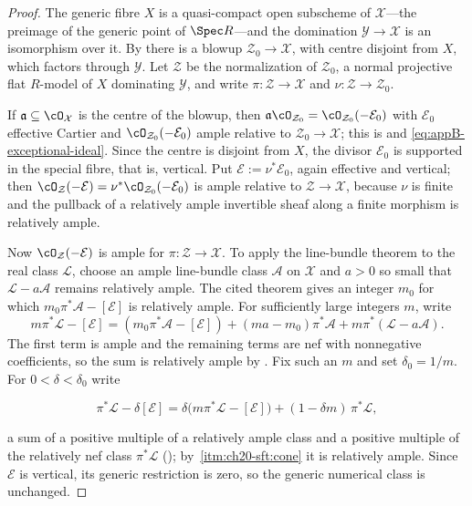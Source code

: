 \begin{proof}
The generic fibre $X$ is a quasi-compact open subscheme of
$\mathcal X$---the preimage of the generic point of $\Spec R$---and the
domination $\mathcal Y\to\mathcal X$ is an isomorphism over it.  By
 there is a blowup
$\mathcal Z_0\to\mathcal X$, with centre disjoint from $X$, which
factors through $\mathcal Y$.  Let $\mathcal Z$ be the normalization of
$\mathcal Z_0$, a normal projective flat $R$-model of $X$ dominating
$\mathcal Y$, and write $\pi:\mathcal Z\to\mathcal X$ and
$\nu:\mathcal Z\to\mathcal Z_0$.

If $\mathfrak a\subseteq\cO_{\mathcal X}$ is the centre of the blowup,
then $\mathfrak a\cO_{\mathcal Z_0}=\cO_{\mathcal Z_0}(-\mathcal E_0)$
with $\mathcal E_0$ effective Cartier and
$\cO_{\mathcal Z_0}(-\mathcal E_0)$ ample relative to
$\mathcal Z_0\to\mathcal X$; this is
 and
\eqref{eq:appB-exceptional-ideal}.  Since the centre is disjoint from
$X$, the divisor $\mathcal E_0$ is supported in the special fibre, that
is, vertical.  Put $\mathcal E:=\nu^*\mathcal E_0$, again effective and
vertical; then
$\cO_{\mathcal Z}(-\mathcal E)=\nu^*\cO_{\mathcal Z_0}(-\mathcal E_0)$ is
ample relative to $\mathcal Z\to\mathcal X$, because $\nu$ is finite and
the pullback of a relatively ample invertible sheaf along a finite morphism
is relatively ample.

Now $\cO_{\mathcal Z}(-\mathcal E)$ is ample for
$\pi:\mathcal Z\to\mathcal X$.  To apply the line-bundle theorem
\cite[4.6.13]{EGAII} to the real class $\mathcal L$, choose an ample
line-bundle class $\mathcal A$ on $\mathcal X$ and $a>0$ so small that
$\mathcal L-a\mathcal A$ remains relatively ample.  The cited theorem
gives an integer $m_0$ for which
$m_0\pi^*\mathcal A-[\mathcal E]$ is relatively ample.
For sufficiently large integers $m$, write
\[
 m\pi^*\mathcal L-[\mathcal E]
 =(m_0\pi^*\mathcal A-[\mathcal E])
   +(ma-m_0)\pi^*\mathcal A
   +m\pi^*(\mathcal L-a\mathcal A).
\]
The first term is ample and the remaining terms are nef with nonnegative
coefficients, so the sum is relatively ample by
.  Fix
such an $m$ and set $\delta_0=1/m$.  For $0<\delta<\delta_0$ write

\[
 \pi^*\mathcal L-\delta[\mathcal E]
 =\delta\bigl(m\pi^*\mathcal L-[\mathcal E]\bigr)
  +(1-\delta m)\,\pi^*\mathcal L ,
\]

a sum of a positive multiple of a relatively ample class and a positive
multiple of the relatively nef class $\pi^*\mathcal L$
(); by
\,\cref{itm:ch20-sft:cone} it is relatively
ample.  Since $\mathcal E$ is vertical, its generic restriction is zero,
so the generic numerical class is unchanged.
\end{proof}

